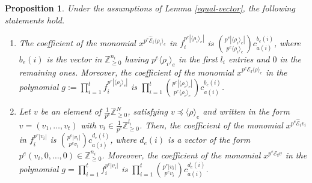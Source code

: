 \documentclass[12pt]{amsart}
\newtheorem{proposition}[theorem]{Proposition}
\theoremstyle{definition}
\numberwithin{equation}{subsection}
\newcommand{\ZZ}{\mathbb{Z}}
\newcommand{\Bf}{\boldsymbol{f}}
\newcommand{\E}{\mathcal{E}}
\newcommand{\tE}{\operatorname{\widehat{\E}}}
\renewcommand{\!}[1]{{\color{red}\text{\Huge$\star$ }#1}}
\begin{document}
\begin{proposition} \label{propoBinomio}
	 Under the assumptions of Lemma \ref{equal-vector}, the following statements hold.
\begin{enumerate}
\item The coefficient of the monomial $x^{p^{e}\tE_i \langle \rho_i \rangle_e}$ in $f_i^{p^{e} |\langle \rho_i \rangle_e|}$ is $\binom{p^{e}|\langle \rho_i \rangle_e|}{p^{e}\langle \rho_i \rangle_e}c_{a(i)}^{b_{e}(i)}$, where $b_{e}(i)$ is the vector in $\ZZ_{\geq 0}^{n_i}$ having $p^{e}\langle \rho_i \rangle_e$ in the first $l_i$ entries and $0$ in the remaining ones. Moreover, the coefficient of the monomial $x^{p^{e}\E_{\Bf} \langle \rho \rangle_e}$ in the polynomial $g:=\prod_{i=1}^{t} f_i^{p^{e}|\langle \rho_i \rangle_e|}$ is $\prod_{i=1}^{t}\binom{p^{e}|\langle \rho_i \rangle_e|}{p^{e}\langle \rho_i \rangle_e}c_{a(i)}^{b_{e}(i)}$.
\item Let $v$ be an element of  $\frac{1}{p^{e}}\ZZ_{\geq 0}^N$, satisfying $v \preceq \langle \rho \rangle_e$ and written in the form $v=(v_1, \ldots, v_t)$ with $v_i \in \frac{1}{p^{e}}\ZZ_{\geq 0}^{l_i}$. Then, the coefficient of the monomial $x^{p^{e}\tE_i v_i}$ in $f_i^{p^{e}|v_i|}$ is $\binom{p^{e}|v_i|}{p^{e} v_i}c_{a(i)}^{d_{e}(i)}$, where $d_{e}(i)$ is a vector of the form $p^e(v_i,0,\ldots,0)\in\ZZ_{\geq 0}^{n_i}$. Moreover, the coefficient of the monomial $x^{p^{e}\E_{\Bf} v}$ in the polynomial $g=\prod_{i=1}^{t} f_i^{p^{e}|v_i|}$ is $\prod_{i=1}^{t}\binom{p^{e}|v_i|}{p^{e}v_i }c_{a(i)}^{d_{e}(i)}$.
\end{enumerate}
\end{proposition}
\end{document}
